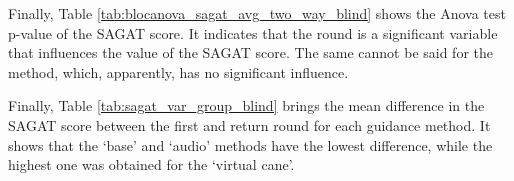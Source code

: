 Finally, Table \ref{tab:blocanova_sagat_avg_two_way_blind} shows the Anova test p-value of the SAGAT score. It indicates that the round is a significant variable that influences the value of the SAGAT score. The same cannot be said for the method, which, apparently, has no significant influence.




%

Finally, Table \ref{tab:sagat_var_group_blind} brings the mean difference in the SAGAT score between the first and return round for each guidance method. It shows that the ‘base’ and ‘audio’ methods have the lowest difference, while the highest one was obtained for the ‘virtual cane’.



